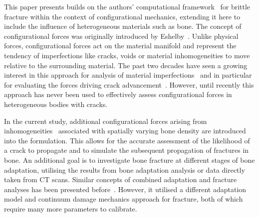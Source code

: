 \documentclass[review]{elsarticle}
\numberwithin{equation}{section}
\begin{document}
This paper presents builds on the authors' computational framework~\citep{kaczmarczyk2017energy} for brittle fracture within the context of configurational mechanics, extending it here to include the influence of heterogeneous materials such as bone.
The concept of configurational forces was originally introduced by Eshelby~\citep{eshelby1951force}. 
Unlike physical forces, configurational forces act on the material manifold and represent the tendency of imperfections like cracks, voids or material inhomogeneities to move relative to the surrounding material. 
The past two decades have seen a growing interest in this approach for analysis of material imperfections~\citep{maugin2016configurational} and in particular for evaluating the forces driving crack advancement~\citep{kaczmarczyk2017energy,steinmann2001application, ozencc2016configurational}. 
However, until recently this approach has never been used to effectively assess configurational forces in heterogeneous bodies with cracks. 

In the current study, additional configurational forces arising from inhomogeneities~\citep{kienzler2014configurational}
associated with spatially varying bone density are introduced into the formulation. This allows for the accurate assessment of the likelihood of a crack to propagate and to simulate  the subsequent propagation of fractures in bone. 
An additional goal is to investigate bone fracture at different stages of bone adaptation, utilising the results from bone adaptation analysis or data directly taken from CT scans. 
Similar concepts of combined adaptation and fracture analyses has been presented before~\citep{hambli2013integrated}. 
However, it utilised a different adaptation model and continuum damage mechanics approach for fracture, both of which require many more parameters to calibrate. 


\end{document}
